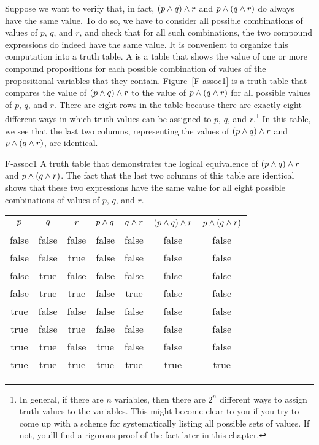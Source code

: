 Suppose we want to verify that, in fact, $(p\wedge q)\wedge r$ and
$p\wedge (q\wedge r)$ do always have the same value.  To do so,
we have to consider all possible combinations of values
of $p$, $q$, and $r$, and check that for all such combinations,
the two compound expressions do indeed have the same value.
It is convenient to organize this computation into a
truth table.  A  is a table that shows the
value of one or more compound propositions for each possible
combination of values of the propositional variables that they contain.
Figure~\ref{F-assoc1} is a truth table that compares the
value of $(p\wedge q)\wedge r$ to the value of $p\wedge (q\wedge r)$
for all possible values of $p$, $q$, and $r$.  There are
eight rows in the table because there are exactly eight different
ways in which truth values can be assigned to $p$, $q$, and
$r$.\footnote{In general, if there are $n$ variables, then
there are $2^n$ different ways to assign truth values to the
variables.  This might become clear to you if you try to come
up with a scheme for systematically listing all possible sets
of values.  If not, you'll find a rigorous proof of the fact 
later in this chapter.}  In this table, we see that the last
two columns, representing the values of
$(p\wedge q)\wedge r$ and $p\wedge (q\wedge r)$, are
identical.

\fig
  {F-assoc1}
  {A truth table that demonstrates the logical equivalence of
      $(p\wedge q)\wedge r$ and $p\wedge(q\wedge r)$.  The fact that the
      last two columns of this table are identical shows that
      these two expressions have the same value for all eight
      possible combinations of values of $p$, $q$, and $r$.}
  {\begin{tabular}{|c|c|c||c|c|c|c|}
        \hline
        $p$& $q$& $r$&
           $p\wedge q$& $q\wedge r$&
           $(p\wedge q)\wedge r$& $p\wedge (q\wedge r)$\\
        \hline
        \strut false& false& false& false& false& false& false\\
        false& false& true&  false& false& false& false\\
        false& true&  false& false& false& false& false\\
        false& true&  true&  false& true&  false& false\\
        true&  false& false& false& false& false& false\\
        true&  false& true&  false& false& false& false\\
        true&  true&  false& true&  false& false& false\\
        true&  true&  true&  true&  true&  true&  true\\
        \hline
     \end{tabular}
   }

